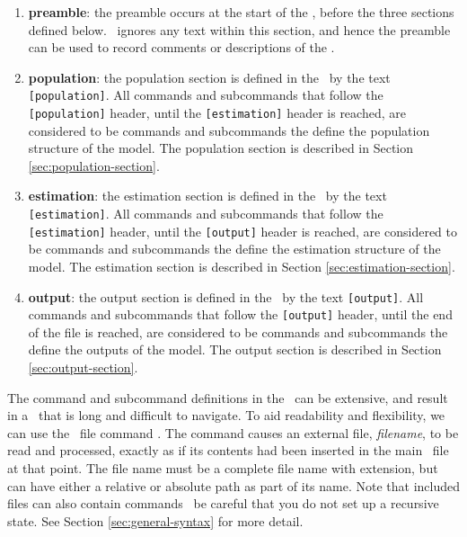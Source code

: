 \begin{enumerate}
\item \textbf{preamble}: 
the preamble occurs at the start of the \config, before the three sections defined below. \SPM\ ignores any text within this section, and hence the preamble can be used to record comments or descriptions of the \config. 

\item \textbf{population}: 
the population section is defined in the \config\ by the text \texttt{[population]}. All commands and subcommands that follow the \texttt{[population]} header, until the \texttt{[estimation]} header is reached, are considered to be commands and subcommands the define the population structure of the model. The population section is described in Section \ref{sec:population-section}.

\item \textbf{estimation}:
the estimation section is defined in the \config\ by the text \texttt{[estimation]}. All commands and subcommands that follow the \texttt{[estimation]} header, until the \texttt{[output]} header is reached, are considered to be commands and subcommands the define the estimation structure of the model.  The estimation section is described in Section \ref{sec:estimation-section}.

\item \textbf{output}:
the output section is defined in the \config\ by the text \texttt{[output]}. All commands and subcommands that follow the \texttt{[output]} header, until the end of the file is reached, are considered to be commands and subcommands the define the outputs of the model.  The output section is described in Section \ref{sec:output-section}.

\end{enumerate}

The command and subcommand definitions in the \config\ can be extensive, and result in a \config\ that is long and difficult to navigate. To aid readability and flexibility, we can use the \config\ file command . The command causes an external file, \emph{filename}, to be read and processed, exactly as if its contents had been inserted in the main \config\ file at that point. The file name must be a complete file name with extension, but can have either a relative or absolute path as part of its name. Note that included files can also contain  commands \textemdash\ be careful that you do not set up a recursive state. See Section \ref{sec:general-syntax} for more detail.

